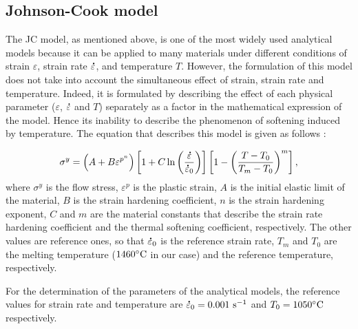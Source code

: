 \documentclass[twoside,english,1p,final,sort&compress]{elsarticle}
\theoremstyle{plain}
\DeclareRobustCommand{\mdot}[1]{\accentset{\mbox{\bfseries .}}{#1}}
\DeclareRobustCommand{\ps}{\text{s}^{-1}}
\begin{document}
\subsection{Johnson-Cook model\label{sec:JC}}

The JC model, as mentioned above, is one of the most widely used analytical models because it can be applied to many materials under different conditions of strain $\varepsilon$, strain rate $\mdot\varepsilon$, and temperature $T$.
However, the formulation of this model does not take into account the simultaneous effect of strain, strain rate and temperature.
Indeed, it is formulated by describing the effect of each physical parameter ($\varepsilon$, $\mdot\varepsilon$ and $T$) separately as a factor in the mathematical expression of the model.
Hence its inability to describe the phenomenon of softening induced by temperature.
The equation that describes this model is given as follows \cite{Johnson-1983}:

\begin{equation}
\sigma^y=\left(A+B\varepsilon^{p^{n}}\right) \left[1+C\ln\left(\frac{\mdot\varepsilon}{\mdot\varepsilon_0}\right)\right] \left[1-\left(\frac{T-T_0}{T_m-T_0}\right)^{m}\right],\label{eq:Johnson-Cook}
\end{equation}
where $\sigma^y$ is the flow stress, $\varepsilon^p$ is the plastic strain, $A$ is the initial elastic limit of the material, $B$ is the strain hardening coefficient, $n$ is the strain hardening exponent, $C$ and $m$ are the material constants that describe the strain rate hardening coefficient and the thermal softening coefficient, respectively.
The other values are reference ones, so that $\mdot\varepsilon_0$ is the reference strain rate, $T_m$ and $T_0$ are the melting temperature ($1460\celsius$ in our case) and the reference temperature, respectively.

For the determination of the parameters of the analytical models, the reference values for strain rate and temperature are $\mdot\varepsilon_0=0.001~\ps$ and $T_0=1050\celsius$ respectively.
\end{document}
